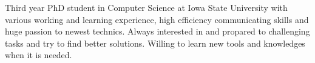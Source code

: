 
\begin{cvparagraph}

Third year PhD student in Computer Science at Iowa State University with various working and learning experience, high efficiency communicating skills and huge passion to newest technics. Always interested in and propared to challenging tasks and try to find better solutions. Willing to learn new tools and knowledges when it is needed.
\end{cvparagraph}
